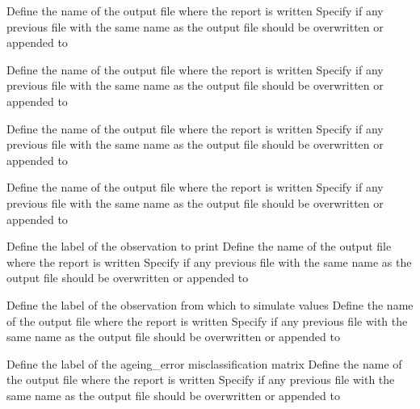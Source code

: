  {Define the name of the output file where the report is written}
 {Specify if any previous file with the same name as the output file should be overwritten or appended to}
\par\textbf{}\par
{} {Define the name of the output file where the report is written}
 {Specify if any previous file with the same name as the output file should be overwritten or appended to}
\par\textbf{}\par
{} {Define the name of the output file where the report is written}
 {Specify if any previous file with the same name as the output file should be overwritten or appended to}
\par\textbf{}\par
{} {Define the name of the output file where the report is written}
 {Specify if any previous file with the same name as the output file should be overwritten or appended to}
\par\textbf{}\par
{} {Define the label of the observation to print}
 {Define the name of the output file where the report is written}
 {Specify if any previous file with the same name as the output file should be overwritten or appended to}
\par\textbf{}\par
{} {Define the label of the observation from which to simulate values}
 {Define the name of the output file where the report is written}
 {Specify if any previous file with the same name as the output file should be overwritten or appended to}
\par\textbf{}\par
{} {Define the label of the ageing\_error misclassification matrix}
 {Define the name of the output file where the report is written}
 {Specify if any previous file with the same name as the output file should be overwritten or appended to}
\par\textbf{}\par
